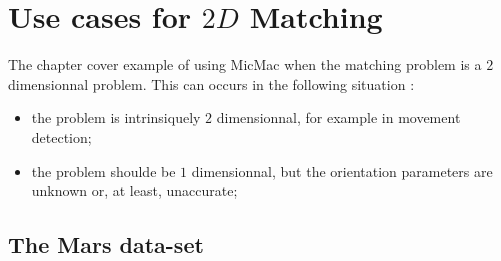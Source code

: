 \chapter{Use cases for $2D$ Matching}

The chapter cover example of using MicMac when the matching problem is
a $2$ dimensionnal problem. This can occurs in the following situation :


\begin{itemize}
   \item the problem is intrinsiquely $2$ dimensionnal, for example in
         movement detection;

   \item the problem shoulde be $1$ dimensionnal, but the orientation parameters
         are unknown or, at least, unaccurate;
\end{itemize}



\section{The Mars data-set}



